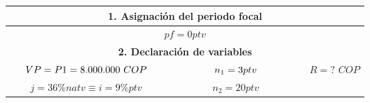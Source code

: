 \begin{center}
	\renewcommand{\arraystretch}{1.5}%
	\begin{longtable}[H]{|c|c|c|}
		\hline
		\multicolumn{3}{|c|}{\cellcolor[HTML]{FFB183}\textbf{1. Asignación del periodo focal}}   \\ \hline
		\multicolumn{3}{|c|}{$pf=0 ptv$}\\ \hline
		\multicolumn{3}{|c|}{\cellcolor[HTML]{FFB183}\textbf{2. Declaración de variables}}   \\ \hline
		$\hspace{0.5 cm}VP=P{1}=8{.}000{.}000\,\,COP\hspace{0.5 cm}$&$\hspace{1.5cm}n_{1}=3ptv\hspace{1.5cm}$& $R= ?\,\,COP$\\
		$j=36\%natv\equiv i=9\%ptv$&$n_{2}=20ptv$& \\
		\hline
		

\end{longtable}
\end{center}
